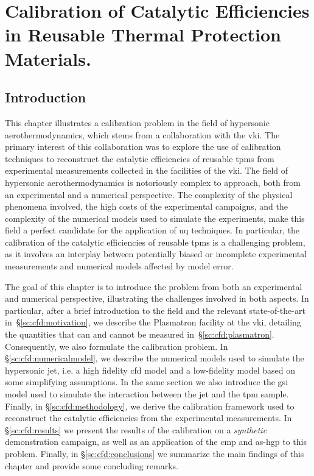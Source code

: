 %
\chapter{Calibration of Catalytic Efficiencies in Reusable Thermal Protection Materials.}
\label{sec:cfd}


\section{Introduction}
\label{sc:cfd:introduction}

This chapter illustrates a calibration problem in the field of hypersonic aerothermodynamics, which stems from a collaboration with the \gls{vki}. The primary interest of this collaboration was to explore the use of calibration techniques to reconstruct the catalytic efficiencies of reusable \glspl{tpm} from experimental measurements collected in the facilities of the \gls{vki}. The field of hypersonic aerothermodynamics is notoriously complex to approach, both from an experimental and a numerical perspective. The complexity of the physical phenomena involved, the high costs of the experimental campaigns, and the complexity of the numerical models used to simulate the experiments, make this field a perfect candidate for the application of \gls{uq} techniques. In particular, the calibration of the catalytic efficiencies of reusable \glspl{tpm} is a challenging problem, as it involves an interplay between potentially biased or incomplete experimental measurements and numerical models affected by model error.

\smallskip
The goal of this chapter is to introduce the problem from both an experimental and numerical perspective, illustrating the challenges involved in both aspects. In particular, after a brief introduction to the field and the relevant state-of-the-art in~\S\ref{sc:cfd:motivation}, we describe the Plasmatron facility at the \gls{vki}, detailing the quantities that can and cannot be measured in~\S\ref{sc:cfd:plasmatron}. Consequently, we also formulate the calibration problem. In \S\ref{sc:cfd:numericalmodel}, we describe the numerical models used to simulate the hypersonic jet, i.e. a high fidelity \gls{cfd} model and a low-fidelity model based on some simplifying assumptions. In the same section we also introduce the \gls{gsi} model used to simulate the interaction between the jet and the \gls{tpm} sample. Finally, in \S\ref{sc:cfd:methodology}, we derive the calibration framework used to reconstruct the catalytic efficiencies from the experimental measurements. In \S\ref{sc:cfd:results} we present the results of the calibration on a \textit{synthetic} demonstration campaign, as well as an application of the \gls{cmp} and \gls{as}-\gls{hgp} to this problem. Finally, in \S\ref{sc:cfd:conclusions} we summarize the main findings of this chapter and provide some concluding remarks.


